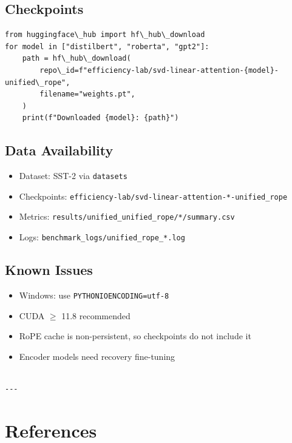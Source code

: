\subsection{Checkpoints}

\begin{lstlisting}
from huggingface\_hub import hf\_hub\_download
for model in ["distilbert", "roberta", "gpt2"]:
    path = hf\_hub\_download(
        repo\_id=f"efficiency-lab/svd-linear-attention-{model}-unified\_rope",
        filename="weights.pt",
    )
    print(f"Downloaded {model}: {path}")
\end{lstlisting}

\subsection{Data Availability}

\begin{itemize}
\item Dataset: SST-2 via \texttt{datasets}
\item Checkpoints: \texttt{efficiency-lab/svd-linear-attention-*-unified\_rope}
\item Metrics: \texttt{results/unified\_unified\_rope/*/summary.csv}
\item Logs: \texttt{benchmark\_logs/unified\_rope\_*.log}

\end{itemize}
\subsection{Known Issues}

\begin{itemize}
\item Windows: use \texttt{PYTHONIOENCODING=utf-8}
\item CUDA $\ge$ 11.8 recommended
\item RoPE cache is non-persistent, so checkpoints do not include it
\item Encoder models need recovery fine-tuning
\end{itemize}
\begin{lstlisting}

---
\end{lstlisting}


\section{References}

